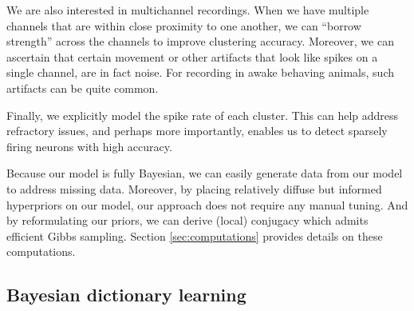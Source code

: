 \documentclass[journal]{IEEEtran}
\begin{document}
We are also interested in multichannel recordings.  When we have multiple channels that are within close proximity to one another, we can ``borrow strength'' across the channels to improve clustering accuracy.  Moreover, we can ascertain that certain movement or other artifacts that look like spikes on a single channel, are in fact noise.  For recording in awake behaving animals, such artifacts can be quite common. 

Finally, we explicitly model the spike rate of each cluster.  This can help address refractory issues, and perhaps more importantly, enables us to detect sparsely firing neurons with high accuracy.

Because our model is fully Bayesian, we can easily generate data from our model to address missing data.  Moreover, by placing relatively diffuse but informed hyperpriors on our model, our approach does not require any manual tuning. And by reformulating our priors, we can derive (local) conjugacy which admits efficient Gibbs sampling.  Section \ref{sec:computations} provides details on these computations.







\subsection{Bayesian dictionary learning\label{sec:dict}}
\end{document}
